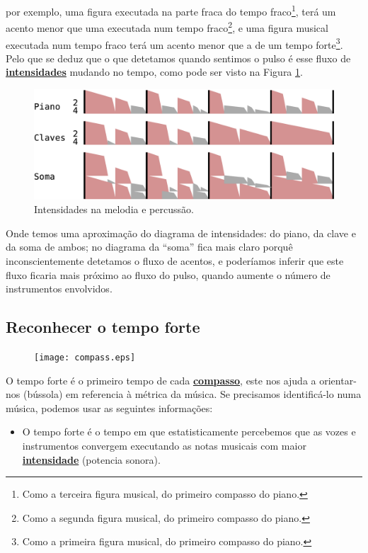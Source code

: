 por exemplo, uma figura executada na parte fraca do tempo fraco\footnote{Como
a terceira figura musical, do primeiro compasso do piano.}, 
terá um acento menor que uma executada num tempo fraco\footnote{Como
a segunda figura musical, do primeiro compasso do piano.}, 
e uma figura musical executada num tempo fraco terá um acento menor que a de um tempo forte\footnote{Como
a primeira figura musical, do primeiro compasso do piano.}.
Pelo que se deduz que o que detetamos quando sentimos o pulso  
é esse fluxo de \hyperref[sec:pos:Intensidade]{\textbf{intensidades}} mudando no tempo, 
como pode ser visto na Figura \ref{ritmo:procurando-pulso2}.
\begin{figure}[!h]
\centering
    \includegraphics[width=\textwidth]{chapters/cap-musicalidade-percepcion/procurando-pulso2.eps}
\caption{Intensidades na melodia e percussão.}
\label{ritmo:procurando-pulso2}
\end{figure}
Onde temos uma aproximação do diagrama de intensidades: do piano, da clave e da soma de ambos;
no diagrama da ``soma'' fica mais claro porquê inconscientemente detetamos o fluxo de acentos,
e poderíamos inferir que este fluxo ficaria mais próximo ao fluxo do pulso, 
quando aumente o número de instrumentos envolvidos.


\subsection{Reconhecer o tempo forte}
\label{subsec:perceberTF1}

\begin{figure}
  \vspace{-10pt}
  \centering
    \texttt{[image: compass.eps]}
  \vspace{-10pt}
\end{figure}
O tempo forte é o primeiro tempo de cada \hyperref[def:Compasso]{\textbf{compasso}},
este nos ajuda a orientar-nos (bússola) em referencia à métrica da música. 
Se precisamos identificá-lo numa música, podemos usar as seguintes informações:
\begin{itemize}
\item O tempo forte é o tempo em que estatisticamente percebemos que as vozes e 
instrumentos convergem executando as notas musicais com maior  \hyperref[sec:pos:Intensidade]{\textbf{intensidade}}  (potencia sonora). 
\end{itemize}

